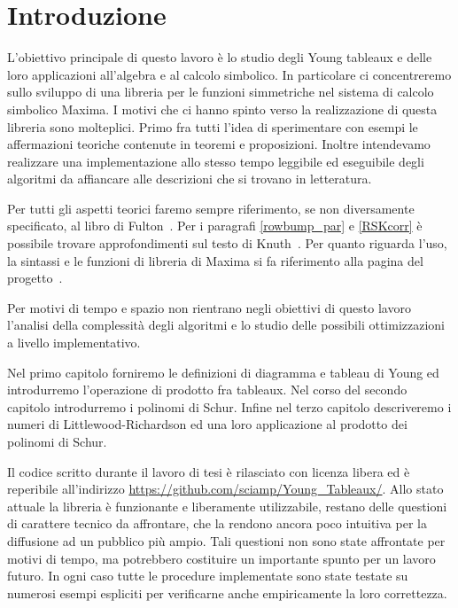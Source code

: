 \chapter*{Introduzione}
L'obiettivo principale di questo lavoro \`e lo studio degli
Young tableaux e delle loro applicazioni all'algebra e al calcolo
simbolico. In particolare ci concentreremo sullo sviluppo di una libreria
per le funzioni simmetriche nel sistema di calcolo simbolico Maxima. I
motivi che ci hanno spinto verso la
realizzazione di questa libreria sono molteplici. Primo fra tutti
l'idea di sperimentare con esempi le affermazioni teoriche
contenute in teoremi e proposizioni. Inoltre intendevamo realizzare
una implementazione allo stesso tempo leggibile ed eseguibile degli
algoritmi da affiancare alle descrizioni che si trovano in
letteratura.

Per tutti gli aspetti teorici faremo sempre riferimento, se non diversamente
specificato, al libro di Fulton~\cite{fulton1997young}. Per i
paragrafi \ref{rowbump_par} e \ref{RSKcorr} \`e possibile trovare
approfondimenti sul testo di Knuth~\cite{knuthart}.
Per quanto riguarda l'uso, la sintassi e le funzioni di
libreria di Maxima si fa riferimento alla pagina del
progetto~\cite{maxima_doc}.

Per motivi di tempo e spazio non rientrano negli obiettivi di questo
lavoro l'analisi della complessit\`a
degli algoritmi e lo studio delle possibili ottimizzazioni a livello
implementativo.

Nel primo capitolo forniremo le definizioni di diagramma e tableau di
Young ed introdurremo l'operazione di prodotto fra tableaux. Nel corso del secondo
capitolo introdurremo i polinomi di Schur. Infine nel terzo capitolo
descriveremo i numeri di Littlewood-Richardson ed una loro
applicazione al prodotto dei polinomi di Schur.

Il codice scritto durante il lavoro di tesi \`e rilasciato con licenza libera ed \`e
reperibile all'indirizzo
\url{https://github.com/sciamp/Young_Tableaux/}.
Allo stato attuale la libreria \`e funzionante e liberamente utilizzabile,
restano delle questioni di carattere tecnico da affrontare,
che la rendono ancora poco intuitiva per la diffusione ad un pubblico pi\`u ampio.
Tali questioni non sono state affrontate per motivi di tempo, ma
potrebbero costituire
un importante spunto per un lavoro futuro. In ogni caso tutte le procedure implementate sono
state testate su numerosi esempi espliciti per verificarne anche empiricamente
la loro correttezza.
